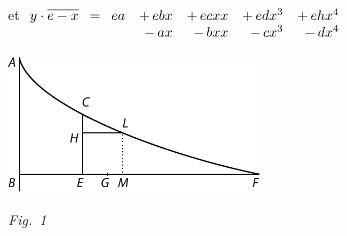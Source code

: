 \pend%
\vspace{-0.25em}
\pstart%
\noindent%
et\ \,$y \cdot \overline{e-x}\ \,=%
\begin{array}[t]{rrrrr}%
ea
& +\,ebx & +\,ecxx & +\,edx^3 & +\,ehx^4 \\
& -\,ax & -\,bxx & -\,cx^3 & -\,dx^4
\end{array}$%
\pend%
\newpage
   \centerline{\includegraphics[width=0.5\textwidth]{gesamttex/edit_VIII,3/images/LH_35_14_02_039r2_d1.pdf}}%
  \vspace{0.5em}
  \centerline{\lbrack\textit{Fig.~1}\rbrack}%
  \label{LH_35_14_02_039r2_Fig.1}%
  \vspace{1.5em}%

